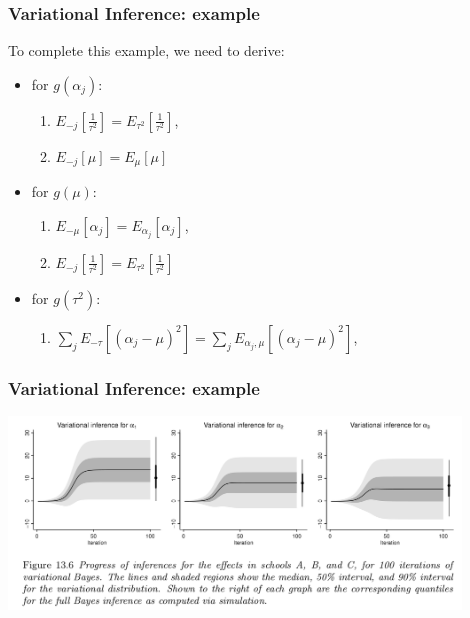 \documentclass{beamer}
\begin{document}
\begin{frame}[fragile]
\frametitle{Variational Inference: example}

To complete this example, we need to derive:
\begin{itemize}
\item for $g(\alpha_j)$: 
  \begin{enumerate}
  \item $E_{-j}\left[\frac{1}{\tau^2}\right] = E_{\tau^2}\left[\frac{1}{\tau^2}\right]$, 
  \item $ E_{-j}[\mu] = E_{\mu}[\mu]$ 
  \end{enumerate}
\item for $g(\mu)$: 
  \begin{enumerate}
  \item $E_{-\mu}[ \alpha_j] = E_{\alpha_j}[ \alpha_j]$, 
  \item $E_{-j}\left[\frac{1}{\tau^2}\right] = E_{\tau^2}\left[\frac{1}{\tau^2}\right]$ 
  \end{enumerate}
\item for $g(\tau^2)$: 
  \begin{enumerate}
  \item $\sum_jE_{-\tau}[(\alpha_j - \mu)^2] = \sum_jE_{\alpha_j,\mu}[(\alpha_j - \mu)^2]$, 
  \end{enumerate}
\end{itemize}

\end{frame}

\begin{frame}[fragile]
\frametitle{Variational Inference: example}

\begin{center}
\includegraphics[width=120mm]{vi_convergence.png}
\end{center}

\end{frame}
\end{document}
